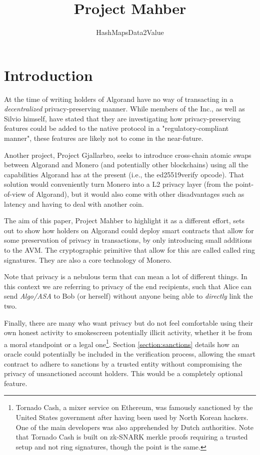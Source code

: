 \documentclass[9pt]{article}
\title{Project Mahber}
\author{HashMapsData2Value}
\begin{document}
\maketitle

\tableofcontents

\newpage

\section{Introduction}

At the time of writing holders of Algorand have no way of transacting in a \textit{decentralized} privacy-preserving manner. While members of the Inc., as well as Silvio himself, have stated that they are investigating how privacy-preserving features could be added to the native protocol in a "regulatory-compliant manner", these features are likely not to come in the near-future.

Another project, Project Gjallarbro, seeks to introduce cross-chain atomic swaps between Algorand and Monero (and potentially other blockchains) using all the capabilities Algorand has at the present (i.e., the ed25519verify opcode). That solution would conveniently turn Monero into a L2 privacy layer (from the point-of-view of Algorand), but it would also come with other disadvantages such as latency and having to deal with another coin.

The aim of this paper, Project Mahber to highlight it as a different effort, sets out to show how holders on Algorand could deploy smart contracts that allow for some preservation of privacy in transactions, by only introducing small additions to the AVM. The cryptographic primitive that allow for this are called called ring signatures. They are also a core technology of Monero.

Note that privacy is a nebulous term that can mean a lot of different things. In this context we are referring to privacy of the end recipients, such that Alice can send \textit{Algo/ASA} to Bob (or herself) without anyone being able to \textit{directly} link the two.

Finally, there are many who want privacy but do not feel comfortable using their own honest activity to smokescreen potentially illicit activity, whether it be from a moral standpoint or a legal one\footnote{Tornado Cash, a mixer service on Ethereum, was famously sanctioned by the United States government after having been used by North Korean hackers. One of the main developers was also apprehended by Dutch authorities. Note that Tornado Cash is built on zk-SNARK merkle proofs requiring a trusted setup and not ring signatures, though the point is the same.}. Section \ref{section:sanctions} details how an oracle could potentially be included in the verification process, allowing the smart contract to adhere to sanctions by a trusted entity without compromising the privacy of unsanctioned account holders. This would be a completely optional feature.
\end{document}
